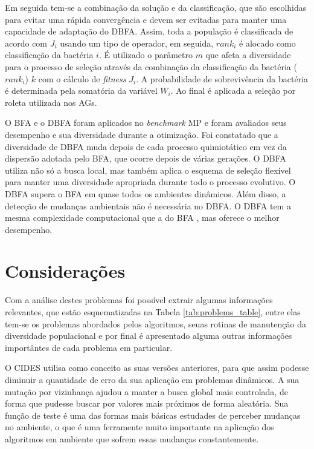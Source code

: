 Em seguida tem-se a combinação da solução e da classificação, que são escolhidas para evitar uma rápida convergência e devem ser evitadas para manter uma capacidade de adaptação do DBFA. Assim, toda a população é classificada de acordo com $J_i$ usando um tipo de operador, em seguida, $rank_i$ é alocado como classificação da bactéria $i$. É utilizado o parâmetro $m$ que afeta a diversidade para o processo de seleção através da combinação da classificação da bactéria ($rank_i$) $k$ com o cálculo de \textit{fitness} $J_i$. A probabilidade de sobrevivência da bactéria é determinada pela somatória da variável $W_i$. Ao final é aplicada a seleção por roleta utilizada nos AGs.

O BFA e o DBFA foram aplicados no \textit{benchmark} MP e foram avaliados seus desempenho e sua diversidade durante a otimização. Foi constatado que a diversidade de DBFA muda depois de cada processo quimiotático em vez da dispersão adotada pelo BFA, que ocorre depois de várias gerações. O DBFA utiliza não só a busca local, mas também aplica o esquema de seleção flexível para manter uma diversidade apropriada durante todo o processo evolutivo. O DBFA supera o BFA em quase todos os ambientes dinâmicos. Além disso, a detecção de mudanças ambientais não é necessária no DBFA. O DBFA tem a mesma complexidade computacional que a do BFA , mas oferece o melhor desempenho.

\section{Considerações}
\label{sec:problems_considerations}

Com a análise destes problemas foi possível extrair algumas informações relevantes, que estão esquematizadas na Tabela \ref{tab:problems_table}, entre elas tem-se os problemas abordados pelos algoritmos, seuas rotinas de manutenção da diversidade populacional e por final é apresentado alguma outras informações importântes de cada problema em particular.

O CIDES utilisa como conceito as suas versões anteriores, para que assim podesse diminuir a quantidade de erro da sua aplicação em problemas dinâmicos. A sua mutação por vizinhança ajudou a manter a busca global mais controlada, de forma que pudesse buscar por valores mais próximos de forma aleatória. Sua função de teste é uma das formas mais básicas estudades de perceber mudanças no ambiente, o que é uma ferramente muito importante na aplicação dos algoritmos em ambiente que sofrem essas mudanças constantemente.

